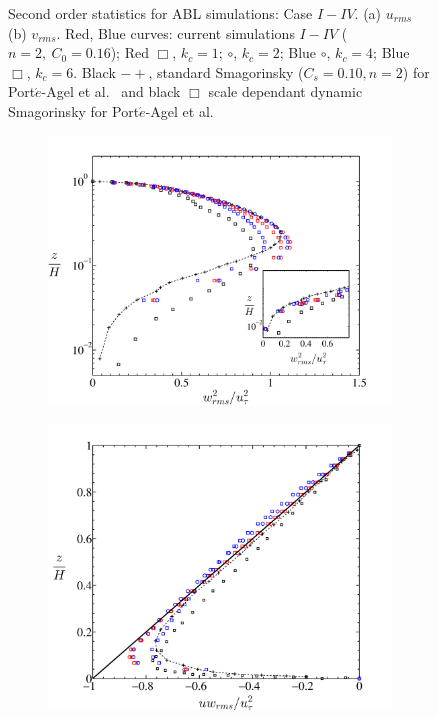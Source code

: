\begin{figure}
\begin{subfigure}[t]{0.75\textwidth}
                \caption{}
                \label{fig:vrms}
        \end{subfigure}
        \caption[Second order statistics $u_{rms}, \ v_{rms}$, Case $I-IV$]{Second order statistics for ABL simulations: Case $I-IV$. (a) $u_{rms}$ (b) $v_{rms}$. Red, Blue curves: current simulations $I-IV$ ($n = 2, \ C_0 = 0.16$);  Red $\Box$, $k_{c}=1$; $\circ$, $k_{c}=2$; Blue $\circ$, $k_{c} = 4$; Blue $\Box$, $k_{c} = 6$.  Black $-+$, standard Smagorinsky ($C_s = 0.10, n = 2$) {for Port$\acute{e}$-Agel et al.~\cite{porte1fun}} and black $\Box$ scale dependant dynamic Smagorinsky for Port$\acute{e}$-Agel et al.~\cite{porte1fun}}\label{fig:stat21}
\end{figure}
\begin{figure}        
        \centering
        \begin{subfigure}[t]{0.75\textwidth}
                \includegraphics[width=\linewidth]{Fig3/wrms_filter_n2.pdf}
                \caption{}
                \label{fig:wrms}
        \end{subfigure}
        \centering
        \begin{subfigure}[t]{0.75\textwidth}
                \includegraphics[width=\linewidth]{Fig3/uwrms_filter_n2.pdf}

\end{subfigure}
\end{figure}
